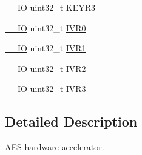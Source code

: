 \begin{DoxyCompactItemize}
\hyperlink{group___c_m_s_i_s__core__definitions_gaec43007d9998a0a0e01faede4133d6be}{\-\_\-\-\_\-\-I\-O} uint32\-\_\-t \hyperlink{struct_a_e_s___type_def_ac4ed72833846f489d10cf751f552de7a}{K\-E\-Y\-R3}
\item 
\hyperlink{group___c_m_s_i_s__core__definitions_gaec43007d9998a0a0e01faede4133d6be}{\-\_\-\-\_\-\-I\-O} uint32\-\_\-t \hyperlink{struct_a_e_s___type_def_a5a27101392cc89c762fc478232a8cfd9}{I\-V\-R0}
\item 
\hyperlink{group___c_m_s_i_s__core__definitions_gaec43007d9998a0a0e01faede4133d6be}{\-\_\-\-\_\-\-I\-O} uint32\-\_\-t \hyperlink{struct_a_e_s___type_def_a6fb98e2e9d464161d805b5785b764ddf}{I\-V\-R1}
\item 
\hyperlink{group___c_m_s_i_s__core__definitions_gaec43007d9998a0a0e01faede4133d6be}{\-\_\-\-\_\-\-I\-O} uint32\-\_\-t \hyperlink{struct_a_e_s___type_def_ab7dcb8897ad132d7c2a334eb5059c955}{I\-V\-R2}
\item 
\hyperlink{group___c_m_s_i_s__core__definitions_gaec43007d9998a0a0e01faede4133d6be}{\-\_\-\-\_\-\-I\-O} uint32\-\_\-t \hyperlink{struct_a_e_s___type_def_a0f7547617d859202a18a12933e7dce8e}{I\-V\-R3}
\end{DoxyCompactItemize}


\subsection{Detailed Description}
A\-E\-S hardware accelerator. 

